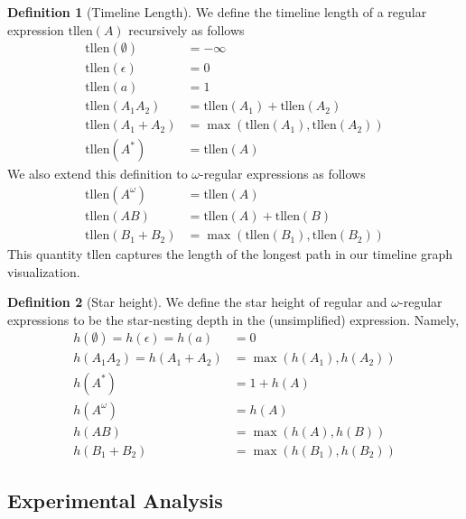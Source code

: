 \documentclass[preprint,12pt]{elsarticle}
\theoremstyle{definition}
\newtheorem{definition}{Definition}[section]
\theoremstyle{remark}
\newcommand{\tllen}{\text{tllen}}
\begin{document}
\begin{definition}[Timeline Length]
    We define the timeline length of a regular expression $\tllen(A)$ recursively as follows
    \begin{align*}
        \tllen(\emptyset)   &= -\infty\\
        \tllen(\epsilon)        &= 0\\
        \tllen(a)           &= 1\\
        \tllen(A_1 A_2)     &= \tllen(A_1) + \tllen(A_2)\\
        \tllen(A_1 + A_2)   &= \max(\tllen(A_1), \tllen(A_2))\\
        \tllen(A^*)         &= \tllen(A) 
    \end{align*}
    We also extend this definition to $\omega$-regular expressions as follows
    \begin{align*}
        \tllen(A^\omega)    &= \tllen(A)\\
        \tllen(AB)          &= \tllen(A) + \tllen(B)\\
        \tllen(B_1 + B_2)   &= \max(\tllen(B_1), \tllen(B_2))
    \end{align*}
    This quantity $\tllen$ captures the length of the longest path in our timeline graph visualization.
\end{definition}

\begin{definition}[Star height]
    We define the star height of regular and $\omega$-regular expressions to be the star-nesting depth in the (unsimplified) expression. Namely,
    \begin{align*}
        h(\emptyset) = h(\epsilon) = h(a) &= 0\\
        h(A_1 A_2) = h(A_1 + A_2) &= \max(h(A_1), h(A_2))\\
        h(A^*) &= 1 + h(A)\\
        h(A^\omega) &= h(A)\\
        h(A B) &= \max(h(A), h(B))\\
        h(B_1 + B_2) &= \max(h(B_1), h(B_2))
    \end{align*}

\end{definition}

\subsection{Experimental Analysis} %
\end{document}
